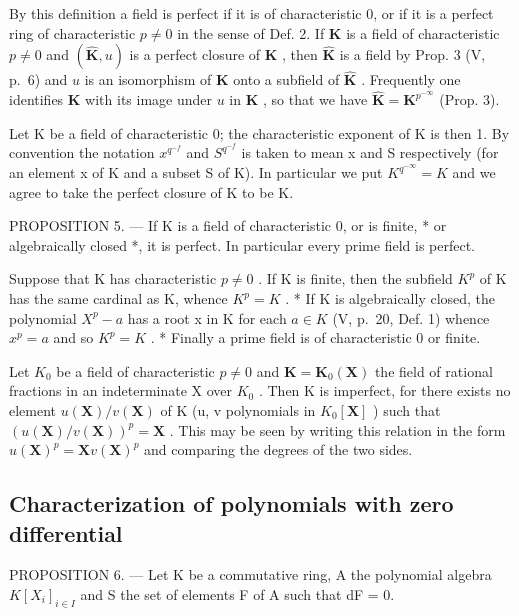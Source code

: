 By this definition a field is perfect if it is of characteristic 0, or if it is a perfect ring of characteristic \(p \neq 0\) in the sense of Def. 2. If \(\mathbf{K}\) is a field of characteristic \(p \neq 0\) and \((\hat{\mathbf{K}}, u)\) is a perfect closure of \(\mathbf{K}\) , then \(\hat{\mathbf{K}}\) is a field by Prop. 3 (V, p.~6) and \(u\) is an isomorphism of \(\mathbf{K}\) onto a subfield of \(\hat{\mathbf{K}}\) . Frequently one identifies \(\mathbf{K}\) with its image under \(u\) in \(\hat{\mathbf{K}}\) , so that we have \(\hat{\mathbf{K}} = \mathbf{K}^{p^{-\infty}}\) (Prop. 3).

Let K be a field of characteristic 0; the characteristic exponent of K is then 1. By convention the notation \(x^{q^{-f}}\) and \(S^{q^{-f}}\) is taken to mean x and S respectively (for an element x of K and a subset S of K). In particular we put \(K^{q^{-\infty}} = K\) and we agree to take the perfect closure of K to be K.

PROPOSITION 5. --- If K is a field of characteristic 0, or is finite, * or algebraically closed *, it is perfect. In particular every prime field is perfect.

Suppose that K has characteristic \(p \neq 0\) . If K is finite, then the subfield \(K^{p}\) of K has the same cardinal as K, whence \(K^{p} = K\) . * If K is algebraically closed, the polynomial \(X^{p} - a\) has a root x in K for each \(a \in K\) (V, p.~20, Def. 1) whence \(x^{p} = a\) and so \(K^{p} = K\) . * Finally a prime field is of characteristic 0 or finite.

Let \(K_{0}\) be a field of characteristic \(p \neq 0\) and \(\mathbf{K} = \mathbf{K}_{0}(\mathbf{X})\) the field of rational fractions in an indeterminate X over \(K_{0}\) . Then K is imperfect, for there exists no element \(u(\mathbf{X})/v(\mathbf{X})\) of K (u, v polynomials in \(K_{0}[\mathbf{X}]\) ) such that \((u(\mathbf{X})/v(\mathbf{X}))^{p} = \mathbf{X}\) . This may be seen by writing this relation in the form \(u(\mathbf{X})^{p} = \mathbf{X}v(\mathbf{X})^{p}\) and comparing the degrees of the two sides.

\subsection{Characterization of polynomials with zero differential}

PROPOSITION 6. --- Let K be a commutative ring, A the polynomial algebra \(K[X_{i}]_{i \in I}\) and S the set of elements F of A such that dF = 0.

